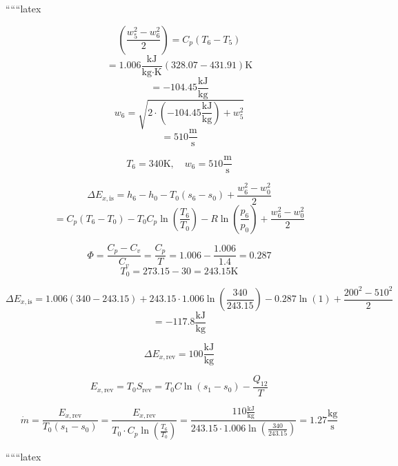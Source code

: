 ``````latex


\[
\left( \frac{w_5^2 - w_6^2}{2} \right) = C_p (T_6 - T_5)
\]
\[
= 1.006 \frac{\text{kJ}}{\text{kg} \cdot \text{K}} (328.07 - 431.91) \text{K}
\]
\[
= -104.45 \frac{\text{kJ}}{\text{kg}}
\]
\[
w_6 = \sqrt{2 \cdot (-104.45 \frac{\text{kJ}}{\text{kg}}) + w_5^2}
\]
\[
= 510 \frac{\text{m}}{\text{s}}
\]

\[
T_6 = 340 \text{K}, \quad w_6 = 510 \frac{\text{m}}{\text{s}}
\]

\[
\Delta E_{x, \text{is}} = h_6 - h_0 - T_0 (s_6 - s_0) + \frac{w_6^2 - w_0^2}{2}
\]
\[
= C_p (T_6 - T_0) - T_0 C_p \ln \left( \frac{T_6}{T_0} \right) - R \ln \left( \frac{p_6}{p_0} \right) + \frac{w_6^2 - w_0^2}{2}
\]

\[
\Phi = \frac{C_p - C_v}{C_v} = \frac{C_p}{T} = 1.006 - \frac{1.006}{1.4} = 0.287
\]
\[
T_0 = 273.15 - 30 = 243.15 \text{K}
\]

\[
\Delta E_{x, \text{is}} = 1.006 \left( 340 - 243.15 \right) + 243.15 \cdot 1.006 \ln \left( \frac{340}{243.15} \right) - 0.287 \ln \left( 1 \right) + \frac{200^2 - 510^2}{2}
\]
\[
= -117.8 \frac{\text{kJ}}{\text{kg}}
\]

\[
\Delta E_{x, \text{rev}} = 100 \frac{\text{kJ}}{\text{kg}}
\]

\[
E_{x, \text{rev}} = T_0 S_{\text{rev}} = T_0 C \ln (s_1 - s_0) - \frac{Q_{12}}{T}
\]

\[
\dot{m} = \frac{E_{x, \text{rev}}}{T_0 (s_1 - s_0)} = \frac{E_{x, \text{rev}}}{T_0 \cdot C_p \ln \left( \frac{T_6}{T_0} \right)} = \frac{110 \frac{\text{kJ}}{\text{kg}}}{243.15 \cdot 1.006 \ln \left( \frac{340}{243.15} \right)} = 1.27 \frac{\text{kg}}{\text{s}}
\]

``````latex


